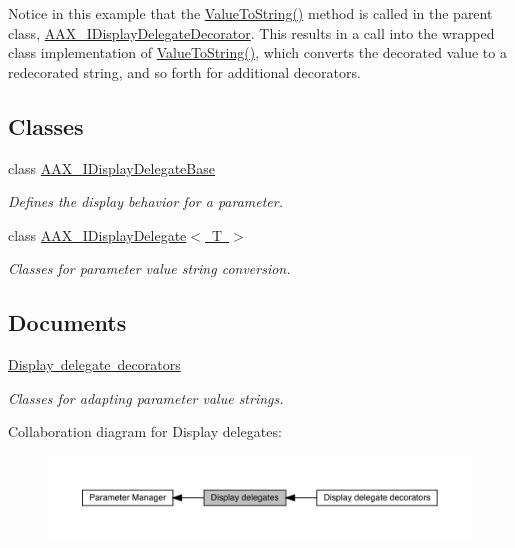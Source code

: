 Notice in this example that the \mbox{\hyperlink{a01805_ada5780cfa332ac7946bf95aa65ae96f5}{Value\+To\+String()}} method is called in the parent class, \mbox{\hyperlink{a01805}{A\+A\+X\+\_\+\+I\+Display\+Delegate\+Decorator}}. This results in a call into the wrapped class\textquotesingle{} implementation of \mbox{\hyperlink{a01805_ada5780cfa332ac7946bf95aa65ae96f5}{Value\+To\+String()}}, which converts the decorated value to a redecorated string, and so forth for additional decorators. \subsection*{Classes}
\begin{DoxyCompactItemize}
\item 
class \mbox{\hyperlink{a01797}{A\+A\+X\+\_\+\+I\+Display\+Delegate\+Base}}
\begin{DoxyCompactList}\small\item\em Defines the display behavior for a parameter. \end{DoxyCompactList}\item 
class \mbox{\hyperlink{a01801}{A\+A\+X\+\_\+\+I\+Display\+Delegate$<$ T $>$}}
\begin{DoxyCompactList}\small\item\em Classes for parameter value string conversion. \end{DoxyCompactList}\end{DoxyCompactItemize}
\subsection*{Documents}
\begin{DoxyCompactItemize}
\item 
\mbox{\hyperlink{a00817}{Display delegate decorators}}
\begin{DoxyCompactList}\small\item\em Classes for adapting parameter value strings. \end{DoxyCompactList}\end{DoxyCompactItemize}
Collaboration diagram for Display delegates\+:
\nopagebreak
\begin{figure}[H]
\begin{center}
\leavevmode
\includegraphics[width=350pt]{a00816}
\end{center}
\end{figure}
